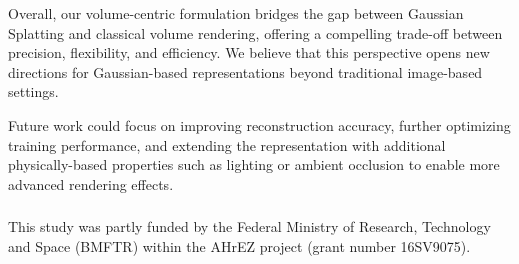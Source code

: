\documentclass[runningheads]{llncs}
\begin{document}
Overall, our volume-centric formulation bridges the gap between Gaussian Splatting and classical volume rendering, offering a compelling trade-off between precision, flexibility, and efficiency. We believe that this perspective opens new directions for Gaussian-based representations beyond traditional image-based settings.

Future work could focus on improving reconstruction accuracy, further optimizing training performance, and extending the representation with additional physically-based properties such as lighting or ambient occlusion to enable more advanced rendering effects.

\begin{credits}
\subsubsection{\ackname} This study was partly funded by the Federal Ministry of Research, Technology and Space (BMFTR) within the AHrEZ project (grant number 16SV9075).

\end{credits}





\end{document}
